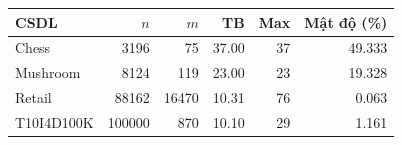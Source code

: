 \begin{tabular}{lrrrrr}
\toprule
CSDL & $n$ & $m$ & TB & Max & Mật độ (\%) \\
\midrule
Chess & 3196 & 75 & 37.00 & 37 & 49.333 \\
Mushroom & 8124 & 119 & 23.00 & 23 & 19.328 \\
Retail & 88162 & 16470 & 10.31 & 76 & 0.063 \\
T10I4D100K & 100000 & 870 & 10.10 & 29 & 1.161 \\
\bottomrule
\end{tabular}
